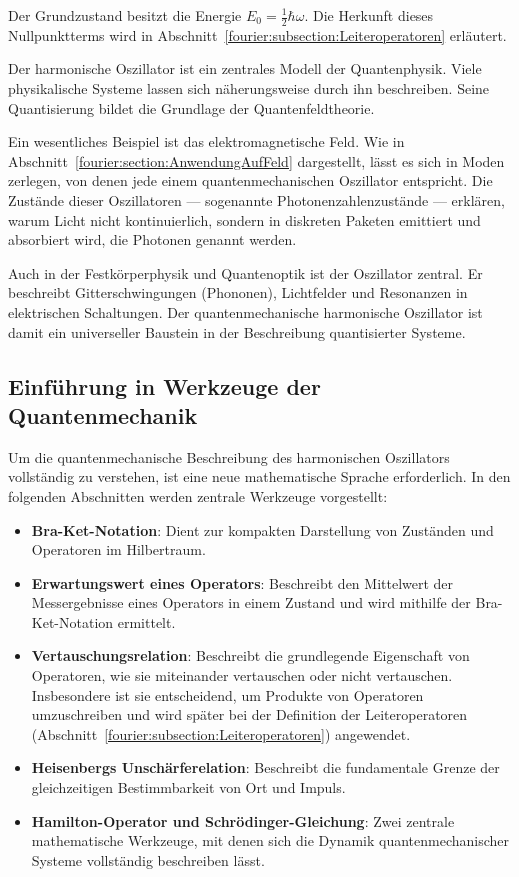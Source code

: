 Der Grundzustand besitzt die Energie $E_0 = \frac{1}{2}\hbar \omega$.
Die Herkunft dieses Nullpunktterms wird in Abschnitt~\ref{fourier:subsection:Leiteroperatoren} erläutert.
%

Der harmonische Oszillator ist ein zentrales Modell der Quantenphysik.
Viele physikalische Systeme lassen sich näherungsweise durch ihn beschreiben.
Seine Quantisierung bildet die Grundlage der Quantenfeldtheorie.

Ein wesentliches Beispiel ist das elektromagnetische Feld.
Wie in Abschnitt~\ref{fourier:section:AnwendungAufFeld} dargestellt, lässt es sich in Moden zerlegen, von denen jede einem quantenmechanischen Oszillator entspricht.
Die Zustände dieser Oszillatoren --- sogenannte Photonenzahlenzustände ---
erklären, warum Licht nicht kontinuierlich, sondern in diskreten Paketen emittiert und absorbiert wird, die Photonen genannt werden.

Auch in der Festkörperphysik und Quantenoptik ist der Oszillator zentral.
Er beschreibt Gitterschwingungen (Phononen), Lichtfelder und Resonanzen in elektrischen Schaltungen.
%
%
Der quantenmechanische harmonische Oszillator ist damit ein universeller Baustein in der Beschreibung quantisierter Systeme.

\subsection{Einführung in Werkzeuge der Quantenmechanik\label{fourier:subsection:werkzeugeQuantenmechanik}}
Um die quantenmechanische Beschreibung des harmonischen Oszillators vollständig zu verstehen, ist eine neue mathematische Sprache erforderlich.
In den folgenden Abschnitten werden zentrale Werkzeuge vorgestellt:
\begin{itemize}
	\item \textbf{Bra-Ket-Notation}:
	Dient zur kompakten Darstellung von Zuständen und Operatoren im Hilbertraum.

	\item \textbf{Erwartungswert eines Operators}:
	Beschreibt den Mittelwert der Messergebnisse eines Operators in einem Zustand und wird mithilfe der Bra-Ket-Notation ermittelt.  

	\item \textbf{Vertauschungsrelation}:
	Beschreibt die grundlegende Eigenschaft von Operatoren, wie sie miteinander vertauschen oder nicht vertauschen.
	Insbesondere ist sie entscheidend, um Produkte von Operatoren umzuschreiben und wird später bei der Definition der Leiteroperatoren
	(Abschnitt~\ref{fourier:subsection:Leiteroperatoren}) angewendet.

	\item \textbf{Heisenbergs Unschärferelation}:
	Beschreibt die fundamentale Grenze der gleichzeitigen Bestimmbarkeit von Ort und Impuls.

	\item \textbf{Hamilton-Operator und Schrödinger-Gleichung}:
	Zwei zentrale mathematische Werkzeuge, mit denen sich die Dynamik quantenmechanischer Systeme vollständig beschreiben lässt.
	
\end{itemize}

